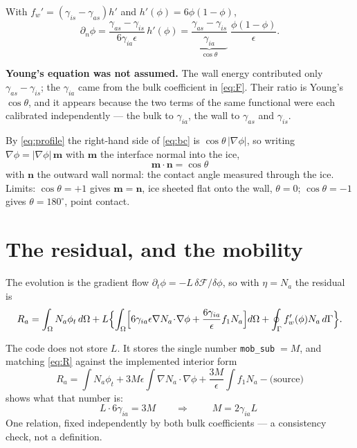 \documentclass[11pt,a4paper]{article}
\newcommand{\code}[1]{\texttt{\small #1}}
\newcommand{\sia}{\gamma_{ia}}
\newcommand{\sis}{\gamma_{is}}
\newcommand{\sas}{\gamma_{as}}
\newcommand{\eps}{\epsilon}
\newcommand{\dn}{\partial_n}
\begin{document}
With $f_w'=(\sis-\sas)h'$ and $h'(\phi)=6\phi(1-\phi)$,
\begin{equation}
\dn\phi
=\frac{\sas-\sis}{6\sia\eps}\,h'(\phi)
=\underbrace{\frac{\sas-\sis}{\sia}}_{\textstyle \cos\theta}\;\frac{\phi(1-\phi)}{\eps} .
\label{eq:bc}
\end{equation}

\textbf{Young's equation was not assumed.} The wall energy contributed only
$\sas-\sis$; the $\sia$ came from the bulk coefficient in \eqref{eq:F}. Their
ratio is Young's $\cos\theta$, and it appears because the two terms of the same
functional were each calibrated independently --- the bulk to $\sia$, the wall to
$\sas$ and $\sis$.

By \eqref{eq:profile} the right-hand side of \eqref{eq:bc} is
$\cos\theta\,|\nabla\phi|$, so writing $\nabla\phi=|\nabla\phi|\,\mathbf{m}$ with
$\mathbf{m}$ the interface normal into the ice,
\begin{equation}
\boxed{\;\mathbf{m}\cdot\mathbf{n}=\cos\theta\;}
\end{equation}
with $\mathbf{n}$ the outward wall normal: the contact angle measured through the
ice. Limits: $\cos\theta=+1$ gives $\mathbf{m}=\mathbf{n}$, ice sheeted flat onto
the wall, $\theta=0$; $\cos\theta=-1$ gives $\theta=180^\circ$, point contact.

\section{The residual, and the mobility}\label{sec:code}

The evolution is the gradient flow $\partial_t\phi=-L\,\delta\mathcal{F}/\delta\phi$,
so with $\eta=N_a$ the residual is
\begin{equation}
R_a=\int_\Omega N_a\phi_t\,d\Omega
+L\Bigl\{\int_\Omega\Bigl[6\sia\eps\nabla N_a\!\cdot\!\nabla\phi
+\frac{6\sia}{\eps}f_1N_a\Bigr]d\Omega
+\oint_\Gamma f_w'(\phi)N_a\,d\Gamma\Bigr\} .
\label{eq:R}
\end{equation}

The code does not store $L$. It stores the single number
\code{mob\_sub}$\;=M$, and matching \eqref{eq:R} against the implemented
interior form
\begin{equation}
R_a=\int N_a\phi_t+3M\eps\!\int\!\nabla N_a\!\cdot\!\nabla\phi
+\frac{3M}{\eps}\!\int\! f_1N_a-\text{(source)}
\label{eq:Rcode}
\end{equation}
shows what that number is:
\begin{equation}
L\cdot 6\sia=3M
\qquad\Longrightarrow\qquad
\boxed{\;M=2\sia L\;}
\label{eq:M}
\end{equation}
One relation, fixed independently by both bulk coefficients --- a consistency
check, not a definition.
\end{document}
